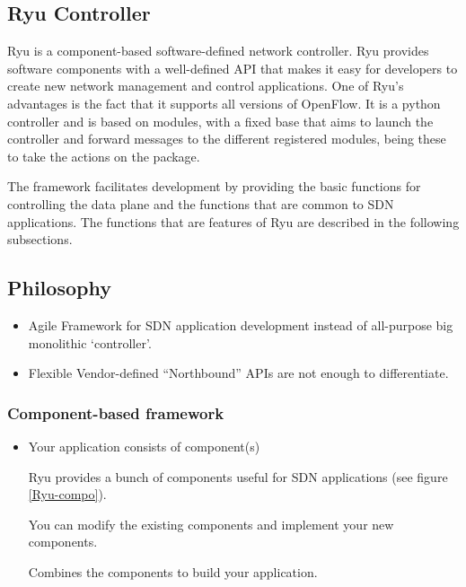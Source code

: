\documentclass[
  oneside,
  11pt, a4paper,
  footinclude=true,
  headinclude=true,
  cleardoublepage=empty
]{scrbook}
\begin{document}
\subsection{Ryu Controller}
\label{Ryu-Controller}

Ryu is a component-based software-defined network controller. Ryu provides software components with a well-defined API that makes it easy for developers to create new network management and control applications. One of Ryu's advantages is the fact that it supports all versions of OpenFlow. It is a python controller and is based on modules, with a fixed base that aims to launch the controller and forward messages to the different registered modules, being these to take the actions on the package.\par
The framework facilitates development by providing the basic functions for controlling the data plane and the functions that are common to SDN applications. The functions that are features of Ryu are described in the following subsections.\par


\subsection{Philosophy}

\begin{itemize}
    \item  Agile
    Framework for SDN application development instead of all-purpose big monolithic ‘controller’.
    \item Flexible
    Vendor-defined “Northbound” APIs are not enough to differentiate.
\end{itemize}

\subsubsection{Component-based framework}

\begin{itemize}
    \item Your application consists of component(s)\par
        Ryu provides a bunch of components useful for SDN
applications (see figure \ref{Ryu-compo}).\par
        You can modify the existing components and implement your new components. \par
        Combines the components to build your application.\par
\end{itemize}
\end{document}
